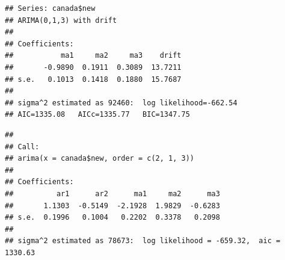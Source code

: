 \documentclass[]{article}
\newenvironment{Shaded}{\begin{snugshade}}{\end{snugshade}}
\newcommand{\DataTypeTok}[1]{\textcolor[rgb]{0.13,0.29,0.53}{#1}}
\newcommand{\DecValTok}[1]{\textcolor[rgb]{0.00,0.00,0.81}{#1}}
\newcommand{\KeywordTok}[1]{\textcolor[rgb]{0.13,0.29,0.53}{\textbf{#1}}}
\newcommand{\NormalTok}[1]{#1}
\newcommand{\OperatorTok}[1]{\textcolor[rgb]{0.81,0.36,0.00}{\textbf{#1}}}
\newcommand{\StringTok}[1]{\textcolor[rgb]{0.31,0.60,0.02}{#1}}
\begin{document}
\begin{Shaded}
\end{Shaded}

\begin{verbatim}
## Series: canada$new 
## ARIMA(0,1,3) with drift 
## 
## Coefficients:
##           ma1     ma2     ma3    drift
##       -0.9890  0.1911  0.3089  13.7211
## s.e.   0.1013  0.1418  0.1880  15.7687
## 
## sigma^2 estimated as 92460:  log likelihood=-662.54
## AIC=1335.08   AICc=1335.77   BIC=1347.75
\end{verbatim}

\begin{Shaded}
\end{Shaded}

\begin{verbatim}
## 
## Call:
## arima(x = canada$new, order = c(2, 1, 3))
## 
## Coefficients:
##          ar1      ar2      ma1     ma2      ma3
##       1.1303  -0.5149  -2.1928  1.9829  -0.6283
## s.e.  0.1996   0.1004   0.2202  0.3378   0.2098
## 
## sigma^2 estimated as 78673:  log likelihood = -659.32,  aic = 1330.63
\end{verbatim}
\end{document}
